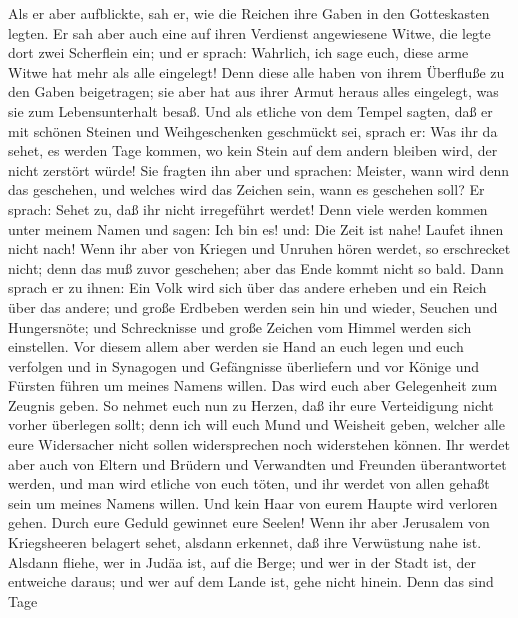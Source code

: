  Als er aber aufblickte, sah er, wie die Reichen ihre
Gaben in den Gotteskasten legten.  Er sah aber auch eine
auf ihren Verdienst angewiesene Witwe, die legte dort zwei Scherflein
ein;  und er sprach: Wahrlich, ich sage euch, diese arme
Witwe hat mehr als alle eingelegt!  Denn diese alle haben
von ihrem Überfluße zu den Gaben beigetragen; sie aber hat aus ihrer
Armut heraus alles eingelegt, was sie zum Lebensunterhalt besaß.
 Und als etliche von dem Tempel sagten, daß er mit schönen
Steinen und Weihgeschenken geschmückt sei, sprach er:  Was
ihr da sehet, es werden Tage kommen, wo kein Stein auf dem andern
bleiben wird, der nicht zerstört würde!  Sie fragten ihn
aber und sprachen: Meister, wann wird denn das geschehen, und welches
wird das Zeichen sein, wann es geschehen soll?  Er sprach:
Sehet zu, daß ihr nicht irregeführt werdet! Denn viele werden kommen
unter meinem Namen und sagen: Ich bin es! und: Die Zeit ist nahe! Laufet
ihnen nicht nach!  Wenn ihr aber von Kriegen und Unruhen
hören werdet, so erschrecket nicht; denn das muß zuvor geschehen; aber
das Ende kommt nicht so bald.  Dann sprach er zu ihnen:
Ein Volk wird sich über das andere erheben und ein Reich über das
andere;  und große Erdbeben werden sein hin und wieder,
Seuchen und Hungersnöte; und Schrecknisse und große Zeichen vom Himmel
werden sich einstellen.  Vor diesem allem aber werden sie
Hand an euch legen und euch verfolgen und in Synagogen und Gefängnisse
überliefern und vor Könige und Fürsten führen um meines Namens willen.
 Das wird euch aber Gelegenheit zum Zeugnis geben.
 So nehmet euch nun zu Herzen, daß ihr eure Verteidigung
nicht vorher überlegen sollt;  denn ich will euch Mund
und Weisheit geben, welcher alle eure Widersacher nicht sollen
widersprechen noch widerstehen können.  Ihr werdet aber
auch von Eltern und Brüdern und Verwandten und Freunden überantwortet
werden, und man wird etliche von euch töten,  und ihr
werdet von allen gehaßt sein um meines Namens willen. 
Und kein Haar von eurem Haupte wird verloren gehen. 
Durch eure Geduld gewinnet eure Seelen!  Wenn ihr aber
Jerusalem von Kriegsheeren belagert sehet, alsdann erkennet, daß ihre
Verwüstung nahe ist.  Alsdann fliehe, wer in Judäa ist,
auf die Berge; und wer in der Stadt ist, der entweiche daraus; und wer
auf dem Lande ist, gehe nicht hinein.  Denn das sind Tage
